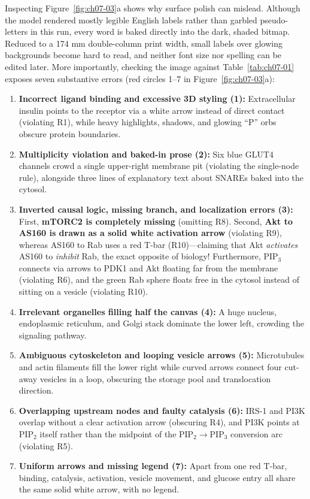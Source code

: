 Inspecting Figure~\ref{fig:ch07-03}a shows why surface polish can mislead. Although the model rendered mostly legible English labels rather than garbled pseudo-letters in this run, every word is baked directly into the dark, shaded bitmap. Reduced to a 174 mm double-column print width, small labels over glowing backgrounds become hard to read, and neither font size nor spelling can be edited later. More importantly, checking the image against Table~\ref{tab:ch07-01} exposes seven substantive errors (red circles 1--7 in Figure~\ref{fig:ch07-03}a):
\begin{enumerate}
\item \textbf{Incorrect ligand binding and excessive 3D styling (1):} Extracellular insulin points to the receptor via a white arrow instead of direct contact (violating R1), while heavy highlights, shadows, and glowing ``P'' orbs obscure protein boundaries.
\item \textbf{Multiplicity violation and baked-in prose (2):} Six blue GLUT4 channels crowd a single upper-right membrane pit (violating the single-node rule), alongside three lines of explanatory text about SNAREs baked into the cytosol.
\item \textbf{Inverted causal logic, missing branch, and localization errors (3):} First, \textbf{mTORC2 is completely missing} (omitting R8). Second, \textbf{Akt to AS160 is drawn as a solid white activation arrow} (violating R9), whereas AS160 to Rab uses a red T-bar (R10)---claiming that Akt \emph{activates} AS160 to \emph{inhibit} Rab, the exact opposite of biology! Furthermore, $\text{PIP}_3$ connects via arrows to PDK1 and Akt floating far from the membrane (violating R6), and the green Rab sphere floats free in the cytosol instead of sitting on a vesicle (violating R10).
\item \textbf{Irrelevant organelles filling half the canvas (4):} A huge nucleus, endoplasmic reticulum, and Golgi stack dominate the lower left, crowding the signaling pathway.
\item \textbf{Ambiguous cytoskeleton and looping vesicle arrows (5):} Microtubules and actin filaments fill the lower right while curved arrows connect four cut-away vesicles in a loop, obscuring the storage pool and translocation direction.
\item \textbf{Overlapping upstream nodes and faulty catalysis (6):} IRS-1 and PI3K overlap without a clear activation arrow (obscuring R4), and PI3K points at $\text{PIP}_2$ itself rather than the midpoint of the $\text{PIP}_2 \rightarrow \text{PIP}_3$ conversion arc (violating R5).
\item \textbf{Uniform arrows and missing legend (7):} Apart from one red T-bar, binding, catalysis, activation, vesicle movement, and glucose entry all share the same solid white arrow, with no legend.
\end{enumerate}

